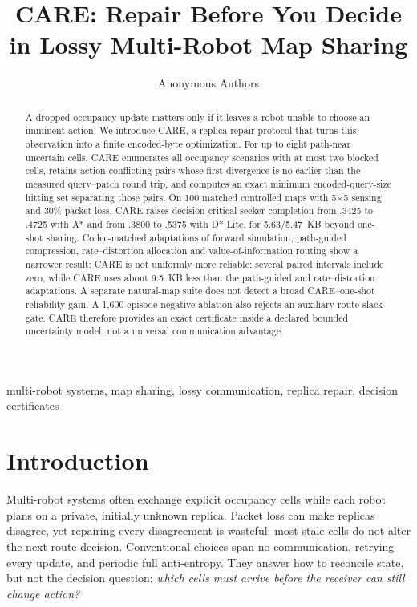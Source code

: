 \documentclass[conference]{IEEEtran}
\title{CARE: Repair Before You Decide in Lossy Multi-Robot Map Sharing}
\author{Anonymous Authors}
\begin{document}
\maketitle

\begin{abstract}
A dropped occupancy update matters only if it leaves a robot unable to choose
an imminent action. We introduce CARE, a replica-repair protocol that turns
this observation into a finite encoded-byte optimization. For up to eight
path-near uncertain cells, CARE enumerates all occupancy scenarios with at most
two blocked cells, retains action-conflicting pairs whose first divergence is
no earlier than the measured query--patch round trip, and computes an exact
minimum encoded-query-size hitting set separating those pairs. On 100 matched controlled
maps with 5$\times$5 sensing and 30\% packet loss, CARE raises decision-critical
seeker completion from .3425 to .4725 with A* and from .3800 to .5375 with D*
Lite, for 5.63/5.47~KB beyond one-shot sharing. Codec-matched adaptations of
forward simulation, path-guided compression, rate--distortion allocation and
value-of-information routing show a narrower result: CARE is not uniformly
more reliable; several paired intervals include zero, while CARE uses about 9.5~KB less than
the path-guided and rate--distortion adaptations. A separate natural-map suite
does not detect a broad CARE--one-shot reliability gain. A 1,600-episode
negative ablation also rejects an auxiliary route-slack gate. CARE therefore
provides an exact certificate inside a declared bounded uncertainty model, not
a universal communication advantage.
\end{abstract}

\begin{IEEEkeywords}
multi-robot systems, map sharing, lossy communication, replica repair,
decision certificates
\end{IEEEkeywords}

\section{Introduction}
Multi-robot systems often exchange explicit occupancy cells while each robot
plans on a private, initially unknown replica. Packet loss can make replicas
disagree, yet repairing every disagreement is wasteful: most stale cells do
not alter the next route decision. Conventional choices span no communication,
retrying every update, and periodic full anti-entropy. They answer how to
reconcile state, but not the decision question: \emph{which cells must arrive
before the receiver can still change action?}
\end{document}
